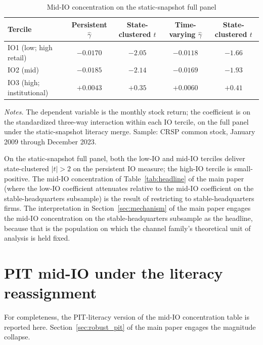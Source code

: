 \documentclass[12pt]{article}
\begin{document}
\begin{table}[h]
\centering
\caption{Mid-IO concentration on the static-snapshot full panel}
\footnotesize
\begin{tabular}{lcccc}
\toprule
Tercile & Persistent $\hat\gamma$ & State-clustered $t$ & Time-varying $\hat\gamma$ & State-clustered $t$ \\
\midrule
IO1 (low; high retail)        & $-0.0170$ & $-2.05$ & $-0.0118$ & $-1.66$ \\
IO2 (mid)                     & $-0.0185$ & $-2.14$ & $-0.0169$ & $-1.93$ \\
IO3 (high; institutional)     & $+0.0043$ & $+0.35$ & $+0.0060$ & $+0.41$ \\
\bottomrule
\end{tabular}

\medskip
{\footnotesize\textit{Notes.} The dependent variable is the monthly stock return; the coefficient is on the standardized three-way interaction within each IO tercile, on the full panel under the static-snapshot literacy merge. Sample: CRSP common stock, January 2009 through December 2023.}
\end{table}

On the static-snapshot full panel, both the low-IO and mid-IO terciles deliver state-clustered $|t|>2$ on the persistent IO measure; the high-IO tercile is small-positive. The mid-IO concentration of Table~\ref{tab:headline} of the main paper (where the low-IO coefficient attenuates relative to the mid-IO coefficient on the stable-headquarters subsample) is the result of restricting to stable-headquarters firms. The interpretation in Section~\ref{sec:mechanism} of the main paper engages the mid-IO concentration on the stable-headquarters subsample as the headline, because that is the population on which the channel family's theoretical unit of analysis is held fixed.

\section{PIT mid-IO under the literacy reassignment}
\label{ia:pitmidio}

For completeness, the PIT-literacy version of the mid-IO concentration table is reported here. Section~\ref{sec:robust_pit} of the main paper engages the magnitude collapse.
\end{document}
